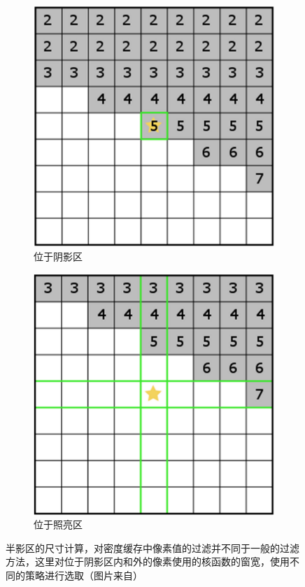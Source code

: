 \begin{figure}
	\begin{subfigure}[b]{0.5\textwidth}
		\includegraphics[width=\textwidth]{figures/shadows/penumbra-size-calculation-1}	
		\caption{位于阴影区}
	\end{subfigure}
	\begin{subfigure}[b]{0.5\textwidth}
		\includegraphics[width=\textwidth]{figures/shadows/penumbra-size-calculation-2}	
		\caption{位于照亮区}
	\end{subfigure}
\caption{半影区的尺寸计算，对密度缓存中像素值的过滤并不同于一般的过滤方法，这里对位于阴影区内和外的像素使用的核函数的窗宽，使用不同的策略进行选取（图片来自\cite{a:Implementingfastraytracedsoftshadowsinagameengine}）}
\label{f:df-ray-tracing-buffers}
\end{figure}

